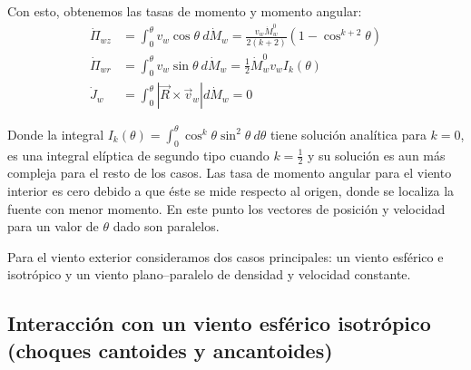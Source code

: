 Con esto, obtenemos las tasas de momento y momento angular:
\begin{align}
  \dot{\Pi}_{wz} &= \int^\theta_0 v_w\cos\theta~d\dot{M}_w = \frac{v_w \dot{M}^0_w}{2\left(k+2\right)}\left(1 - \cos^{k+2}\theta\right) \label{eq:Pi-wz} \\
  \dot{\Pi}_{wr} &= \int^\theta_0 v_w\sin\theta~d\dot{M}_w = \frac{1}{2}\dot{M}^0_w v_w I_k(\theta) \\
  \dot{J}_w &= \int^\theta_0 |\vec{R} \times \vec{v}_w|d\dot{M}_w = 0 \label{eq:inner-dot-J}
\end{align}

Donde la integral $I_k(\theta) = \int^\theta_0 \cos^k\theta \sin^2\theta~d\theta$ tiene solución analítica para $k=0$, es una integral elíptica de segundo tipo cuando $k=\frac{1}{2}$ y su solución es aun más compleja para el resto de los
casos. Las tasa de momento angular para el viento interior es cero debido a que éste se mide respecto al origen, donde se localiza la fuente con menor momento. En este punto los vectores de posición y velocidad para un valor de $\theta$
dado son paralelos.

Para el viento exterior consideramos dos casos principales: un viento esférico e isotrópico y un viento plano--paralelo de densidad y velocidad constante.

\subsection{Interacción con un viento esférico isotrópico (choques cantoides y ancantoides)}
\label{sec:mod-isotropic}

